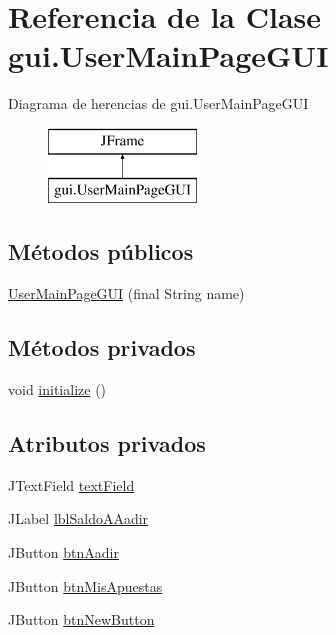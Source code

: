 \hypertarget{classgui_1_1UserMainPageGUI}{}\section{Referencia de la Clase gui.\+User\+Main\+Page\+G\+UI}
\label{classgui_1_1UserMainPageGUI}
Diagrama de herencias de gui.\+User\+Main\+Page\+G\+UI\begin{figure}[H]
\begin{center}
\leavevmode
\includegraphics[height=2.000000cm]{classgui_1_1UserMainPageGUI}
\end{center}
\end{figure}
\subsection*{Métodos públicos}
\begin{DoxyCompactItemize}
\item 
\mbox{\hyperlink{classgui_1_1UserMainPageGUI_a25a280353dd2dba519823577052d559d}{User\+Main\+Page\+G\+UI}} (final String name)
\end{DoxyCompactItemize}
\subsection*{Métodos privados}
\begin{DoxyCompactItemize}
\item 
void \mbox{\hyperlink{classgui_1_1UserMainPageGUI_a791979d127c9afba1a1a97cd1de7afc0}{initialize}} ()
\end{DoxyCompactItemize}
\subsection*{Atributos privados}
\begin{DoxyCompactItemize}
\item 
J\+Text\+Field \mbox{\hyperlink{classgui_1_1UserMainPageGUI_ae4a60bf0e50517142c8c03fbace32901}{text\+Field}}
\item 
J\+Label \mbox{\hyperlink{classgui_1_1UserMainPageGUI_aa42122f2cc36310cfb199a83882e42a3}{lbl\+Saldo\+A\+Aadir}}
\item 
J\+Button \mbox{\hyperlink{classgui_1_1UserMainPageGUI_a2672451d61382e7df4ddfb581b4c8ccf}{btn\+Aadir}}
\item 
J\+Button \mbox{\hyperlink{classgui_1_1UserMainPageGUI_aaa882a6ea2015ea8d12bcea1cbd539c7}{btn\+Mis\+Apuestas}}
\item 
J\+Button \mbox{\hyperlink{classgui_1_1UserMainPageGUI_ae4286f606454db2acce1ec498854c19e}{btn\+New\+Button}}
\end{DoxyCompactItemize}
